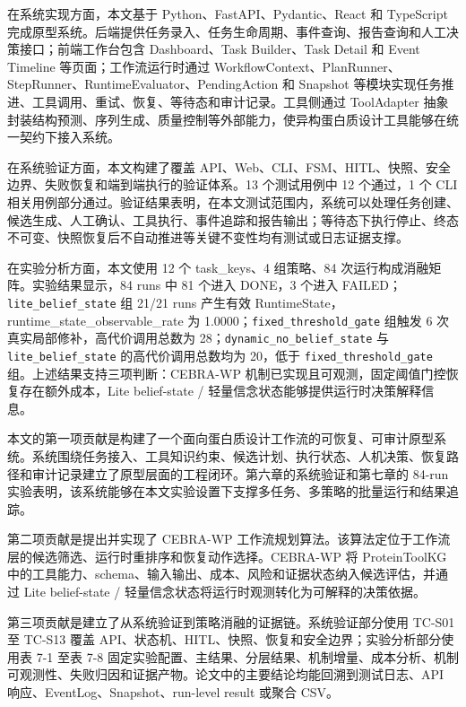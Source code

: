 在系统实现方面，本文基于 Python、FastAPI、Pydantic、React 和 TypeScript
完成原型系统。后端提供任务录入、任务生命周期、事件查询、报告查询和人工决策接口；前端工作台包含
Dashboard、Task Builder、Task Detail 和 Event Timeline
等页面；工作流运行时通过
WorkflowContext、PlanRunner、StepRunner、RuntimeEvaluator、PendingAction
和 Snapshot
等模块实现任务推进、工具调用、重试、恢复、等待态和审计记录。工具侧通过
ToolAdapter
抽象封装结构预测、序列生成、质量控制等外部能力，使异构蛋白质设计工具能够在统一契约下接入系统。

在系统验证方面，本文构建了覆盖
API、Web、CLI、FSM、HITL、快照、安全边界、失败恢复和端到端执行的验证体系。13
个测试用例中 12 个通过，1 个 CLI
相关用例部分通过。验证结果表明，在本文测试范围内，系统可以处理任务创建、候选生成、人工确认、工具执行、事件追踪和报告输出；等待态下执行停止、终态不可变、快照恢复后不自动推进等关键不变性均有测试或日志证据支撑。

在实验分析方面，本文使用 12 个 task\_keys、4 组策略、84
次运行构成消融矩阵。实验结果显示，84 runs 中 81 个进入 DONE，3 个进入
FAILED；\texttt{lite\_belief\_state} 组 21/21 runs 产生有效
RuntimeState，runtime\_state\_observable\_rate 为
1.0000；\texttt{fixed\_threshold\_gate} 组触发 6
次真实局部修补，高代价调用总数为 28；\texttt{dynamic\_no\_belief\_state}
与 \texttt{lite\_belief\_state} 的高代价调用总数均为 20，低于
\texttt{fixed\_threshold\_gate} 组。上述结果支持三项判断：CEBRA-WP
机制已实现且可观测，固定阈值门控恢复存在额外成本，Lite belief-state /
轻量信念状态能够提供运行时决策解释信息。

本文的第一项贡献是构建了一个面向蛋白质设计工作流的可恢复、可审计原型系统。系统围绕任务接入、工具知识约束、候选计划、执行状态、人机决策、恢复路径和审计记录建立了原型层面的工程闭环。第六章的系统验证和第七章的
84-run
实验表明，该系统能够在本文实验设置下支撑多任务、多策略的批量运行和结果追踪。

第二项贡献是提出并实现了 CEBRA-WP
工作流规划算法。该算法定位于工作流层的候选筛选、运行时重排序和恢复动作选择。CEBRA-WP
将 ProteinToolKG
中的工具能力、schema、输入输出、成本、风险和证据状态纳入候选评估，并通过
Lite belief-state / 轻量信念状态将运行时观测转化为可解释的决策依据。

第三项贡献是建立了从系统验证到策略消融的证据链。系统验证部分使用 TC-S01
至 TC-S13 覆盖
API、状态机、HITL、快照、恢复和安全边界；实验分析部分使用表 7-1 至表 7-8
固定实验配置、主结果、分层结果、机制增量、成本分析、机制可观测性、失败归因和证据产物。论文中的主要结论均能回溯到测试日志、API
响应、EventLog、Snapshot、run-level result 或聚合 CSV。


